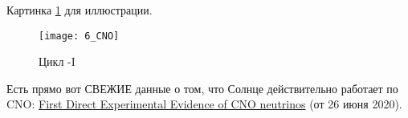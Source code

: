 Картинка \ref{fig:6_CNO} для иллюстрации.

\begin{figure}[H]
	\centering
	\texttt{[image: 6\_CNO]}
	\caption{Цикл -I}
	\label{fig:6_CNO}
\end{figure}

Есть прямо вот СВЕЖИЕ данные о том, что Солнце действительно работает по CNO: \href{https://arxiv.org/abs/2006.15115}{First Direct Experimental Evidence of CNO neutrinos} (от 26 июня 2020).

%
%
%
%
%
%
%
%
